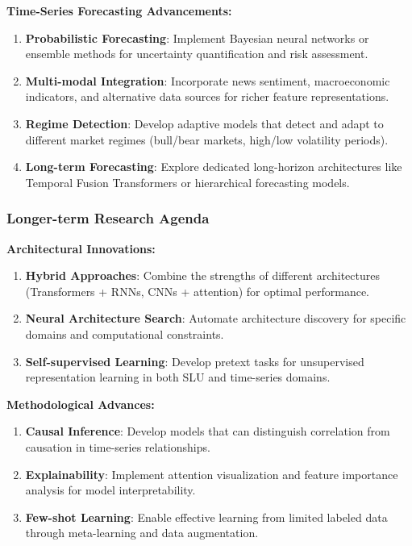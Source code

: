 \documentclass[conference]{IEEEtran}
\begin{document}
\textbf{Time-Series Forecasting Advancements:}
\begin{enumerate}
  \item \textbf{Probabilistic Forecasting}: Implement Bayesian neural networks or ensemble methods for uncertainty quantification and risk assessment.

  \item \textbf{Multi-modal Integration}: Incorporate news sentiment, macroeconomic indicators, and alternative data sources for richer feature representations.

  \item \textbf{Regime Detection}: Develop adaptive models that detect and adapt to different market regimes (bull/bear markets, high/low volatility periods).

  \item \textbf{Long-term Forecasting}: Explore dedicated long-horizon architectures like Temporal Fusion Transformers or hierarchical forecasting models.
\end{enumerate}

\subsubsection{Longer-term Research Agenda}

\textbf{Architectural Innovations:}
\begin{enumerate}
  \item \textbf{Hybrid Approaches}: Combine the strengths of different architectures (Transformers + RNNs, CNNs + attention) for optimal performance.

  \item \textbf{Neural Architecture Search}: Automate architecture discovery for specific domains and computational constraints.

  \item \textbf{Self-supervised Learning}: Develop pretext tasks for unsupervised representation learning in both SLU and time-series domains.
\end{enumerate}

\textbf{Methodological Advances:}
\begin{enumerate}
  \item \textbf{Causal Inference}: Develop models that can distinguish correlation from causation in time-series relationships.

  \item \textbf{Explainability}: Implement attention visualization and feature importance analysis for model interpretability.

  \item \textbf{Few-shot Learning}: Enable effective learning from limited labeled data through meta-learning and data augmentation.
\end{enumerate}
\end{document}
